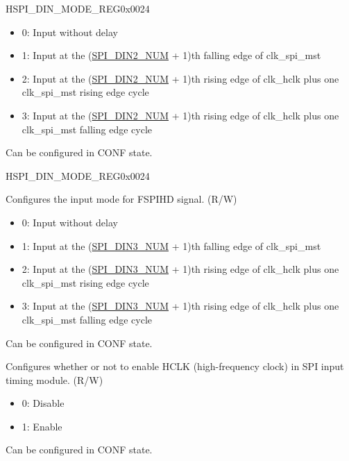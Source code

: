 \begin{register}{H}{SPI\_DIN\_MODE\_REG}{0x0024}
\begin{regdesc}
\begin{reglist}
\begin{itemize}
    \item 0: Input without delay
    \item 1: Input at the (\hyperref[fielddesc:SPIDIN2NUM]{SPI\_DIN2\_NUM} + 1)th falling edge of clk\_spi\_mst
    \item 2: Input at the (\hyperref[fielddesc:SPIDIN2NUM]{SPI\_DIN2\_NUM} + 1)th rising edge of clk\_hclk plus one clk\_spi\_mst rising edge cycle
    \item 3: Input at the (\hyperref[fielddesc:SPIDIN2NUM]{SPI\_DIN2\_NUM} + 1)th rising edge of clk\_hclk plus one clk\_spi\_mst falling edge cycle
\end{itemize}
Can be configured in CONF state. 
\item [Continued on the next page...]
\end{reglist}\end{regdesc}
\end{register}

\addtocounter{Regfloat}{-1}
\begin{register}{H}{SPI\_DIN\_MODE\_REG}{0x0024}
\begin{regdesc}\begin{reglist}
\item [Continued from the previous page...]
\label{fielddesc:SPIDIN3MODE}\item [SPI\_DIN3\_MODE] Configures the input mode for FSPIHD signal. (R/W)
\begin{itemize}
    \item 0: Input without delay
    \item 1: Input at the (\hyperref[fielddesc:SPIDIN3NUM]{SPI\_DIN3\_NUM} + 1)th falling edge of clk\_spi\_mst
    \item 2: Input at the (\hyperref[fielddesc:SPIDIN3NUM]{SPI\_DIN3\_NUM} + 1)th rising edge of clk\_hclk plus one clk\_spi\_mst rising edge cycle
    \item 3: Input at the (\hyperref[fielddesc:SPIDIN3NUM]{SPI\_DIN3\_NUM} + 1)th rising edge of clk\_hclk plus one clk\_spi\_mst falling edge cycle
\end{itemize}
Can be configured in CONF state. 


\label{fielddesc:SPITIMINGHCLKACTIVE}\item [SPI\_TIMING\_HCLK\_ACTIVE] Configures whether or not to enable HCLK (high-frequency clock) in SPI input timing module. (R/W)\\
\begin{itemize}
    \item 0: Disable
    \item 1: Enable
\end{itemize}
Can be configured in CONF state. 
\end{reglist}\end{regdesc}
\end{register}


